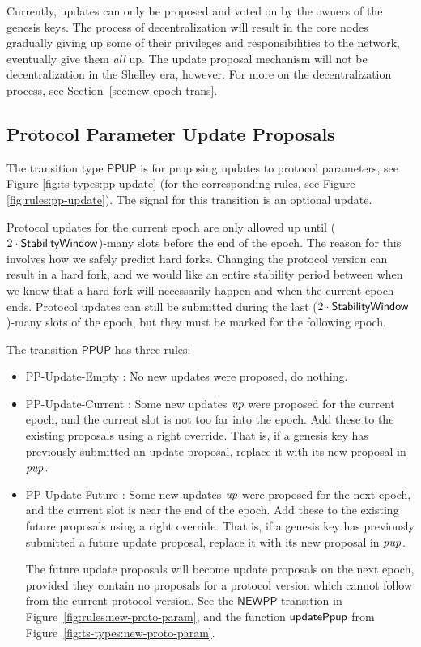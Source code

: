 Currently, updates can only be proposed and voted on by the owners of the genesis keys.
The process of decentralization will result in the core nodes gradually giving up
some of their privileges and responsibilities to the network,
eventually give them \textit{all} up.
The update proposal mechanism will not be decentralization in the Shelley era, however.
For more on the decentralization process, see Section~\ref{sec:new-epoch-trans}.

\subsection{Protocol Parameter Update Proposals}
\label{sec:pp-proposals}

The transition type $\mathsf{PPUP}$ is for proposing updates to protocol
parameters, see Figure \ref{fig:ts-types:pp-update} (for the corresponding rules,
see Figure \ref{fig:rules:pp-update}).
The signal for this transition is an optional update.

Protocol updates for the current epoch are only allowed up until
($2\cdot\mathsf{StabilityWindow}$)-many slots before the end of the epoch.
The reason for this involves how we safely predict hard forks.
Changing the protocol version can result in a hard fork, and we would like an
entire stability period between when we know that a hard fork will necessarily happen
and when the current epoch ends.
Protocol updates can still be submitted during the last
($2\cdot\mathsf{StabilityWindow}$)-many slots of the epoch, but they must
be marked for the following epoch.

The transition $\mathsf{PPUP}$ has three rules:
\begin{itemize}
  \item PP-Update-Empty : No new updates were proposed, do nothing.
  \item PP-Update-Current : Some new updates $\mathit{up}$ were proposed
    for the current epoch, and the current slot is not too far into the epoch.
    Add these to the existing proposals using a right override. That is, if a genesis key
    has previously submitted an update proposal, replace it with its new
    proposal in $\mathit{pup}$.
  \item PP-Update-Future : Some new updates $\mathit{up}$ were proposed
    for the next epoch, and the current slot is near the end of the epoch.
    Add these to the existing future proposals using a right override. That is, if a genesis key
    has previously submitted a future update proposal, replace it with its new
    proposal in $\mathit{pup}$.

    The future update proposals will become update proposals on the next epoch,
    provided they contain no proposals for a protocol version which cannot follow
    from the current protocol version.
    See the $\mathsf{NEWPP}$ transition in Figure~\ref{fig:rules:new-proto-param},
    and the function $\mathsf{updatePpup}$ from Figure~\ref{fig:ts-types:new-proto-param}.
\end{itemize}

